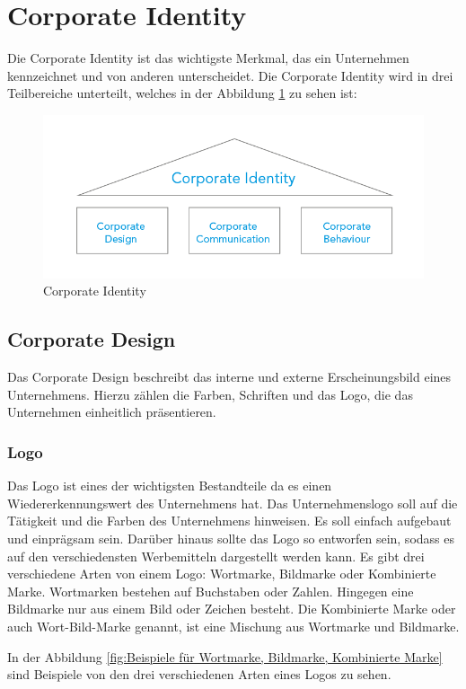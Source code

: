 \section{Corporate Identity}
Die Corporate Identity ist das wichtigste Merkmal, das ein Unternehmen kennzeichnet und von anderen unterscheidet. Die Corporate Identity wird in drei Teilbereiche unterteilt, welches in der Abbildung \ref{fig:CorporateIdentity} zu sehen ist:

\begin{figure}[H]
	\centering
	\includegraphics[width=0.5\linewidth]{images/CorporateIdentity.png}
	\caption[Corporate Identity]{Corporate Identity}
	\label{fig:CorporateIdentity}
\end{figure}

\subsection{Corporate Design}
Das Corporate Design beschreibt das interne und externe Erscheinungsbild eines Unternehmens. Hierzu zählen die Farben, Schriften und das Logo, die das Unternehmen einheitlich präsentieren. \parencite{CorporateIdentity}

\newpage
\subsubsection{Logo}
Das Logo ist eines der wichtigsten Bestandteile da es einen Wiedererkennungswert des Unternehmens hat. Das Unternehmenslogo soll auf die Tätigkeit und die Farben des Unternehmens hinweisen. Es soll einfach aufgebaut  und einprägsam sein. Darüber hinaus sollte das Logo so entworfen sein, sodass es auf den verschiedensten Werbemitteln dargestellt werden kann. Es gibt drei verschiedene Arten von einem Logo: Wortmarke, Bildmarke oder Kombinierte Marke. Wortmarken bestehen auf Buchstaben oder Zahlen. Hingegen eine Bildmarke nur aus einem Bild oder Zeichen besteht. Die Kombinierte Marke oder auch Wort-Bild-Marke genannt, ist eine Mischung aus Wortmarke und Bildmarke. \parencite{Firmenlogo} 

In der Abbildung \ref{fig:Beispiele für Wortmarke, Bildmarke, Kombinierte Marke} sind Beispiele von den drei verschiedenen Arten eines Logos zu sehen.

